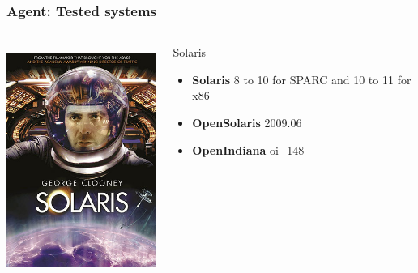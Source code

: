 \documentclass{beamer}
\begin{document}
\begin{frame}
    \frametitle{Agent: Tested systems}

 \begin{columns}
 \begin{column}{0.35\textwidth}
         \includegraphics[height=7.5cm]{./pics/os/solaris.jpg}
 \end{column}
 \begin{column}{0.65\textwidth}
    \begin{block}{Solaris}
        \begin{itemize}
            \item \textbf{Solaris} 8 to 10 for SPARC and 10 to 11 for x86
            \item \textbf{OpenSolaris} 2009.06
            \item \textbf{OpenIndiana} oi\_148
        \end{itemize}
    \end{block}
 \end{column}
\end{columns}

\end{frame}
\end{document}
